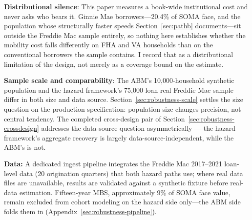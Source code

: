 \documentclass[12pt]{article}
\begin{document}
\textbf{Distributional silence}: This paper measures a book-wide institutional cost and never asks who bears it. Ginnie Mae borrowers---20.4\% of SOMA face, and the population whose structurally faster speeds Section~\ref{sec:pathb} documents---sit outside the Freddie Mac sample entirely, so nothing here establishes whether the mobility cost falls differently on FHA and VA households than on the conventional borrowers the sample contains. I record that as a distributional limitation of the design, not merely as a coverage bound on the estimate.

\textbf{Sample scale and comparability}: The ABM's 10,000-household synthetic population and the hazard framework's 75,000-loan real Freddie Mac sample differ in both size and data source. Section~\ref{sec:robustness-scale} settles the size question on the production specification: population size changes precision, not central tendency. The completed cross-design pair of Section~\ref{sec:robustness-crossdesign} addresses the data-source question asymmetrically --- the hazard framework's aggregate recovery is largely data-source-independent, while the ABM's is not.

\textbf{Data:} A dedicated ingest pipeline integrates the Freddie Mac 2017--2021 loan-level data (20 origination quarters) that both hazard paths use; where real data files are unavailable, results are validated against a synthetic fixture before real-data estimation. Fifteen-year MBS, approximately 9\% of SOMA face value, remain excluded from cohort modeling on the hazard side only---the ABM side folds them in (Appendix~\ref{sec:robustness-pipeline}).
\end{document}
